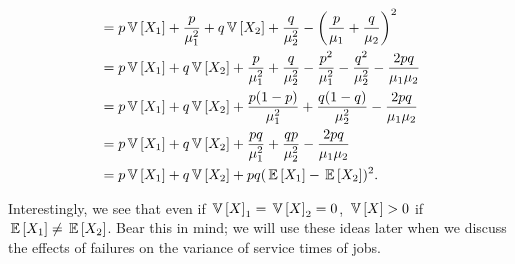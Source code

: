 \begin{question}
\begin{solution}
\begin{equation*}
\begin{split}
&= p \,\mathbb{V}\left[X_1\right] + \frac{p}{\mu_1^2} + q \,\mathbb{V}\left[X_2\right] + \frac{q}{\mu_2^2} - \left(\frac{p}{\mu_1}+\frac{q}{\mu_2}\right)^2 \\ 
&= p \,\mathbb{V}\left[X_1\right] + q \,\mathbb{V}\left[X_2\right]
+ \frac{p}{\mu_1^2} + \frac{q}{\mu_2^2}
- \frac{p^2}{\mu_1^2}-\frac{q^2}{\mu_2^2}  -\frac{2pq}{\mu_1\mu_2}\\ 
&= p \,\mathbb{V}\left[X_1\right] + q \,\mathbb{V}\left[X_2\right]
+ \frac{p(1-p)}{\mu_1^2} + \frac{q(1-q)}{\mu_2^2}
-\frac{2pq}{\mu_1\mu_2}\\ 
&= p \,\mathbb{V}\left[X_1\right] + q \,\mathbb{V}\left[X_2\right]
+ \frac{pq}{\mu_1^2} + \frac{qp}{\mu_2^2}
-\frac{2pq}{\mu_1\mu_2}\\ 
&= p \,\mathbb{V}\left[X_1\right] + q \,\mathbb{V}\left[X_2\right]
+ pq(\,\mathbb{E}\left[X_1\right] - \,\mathbb{E}\left[X_2\right])^2.
\end{split}
\end{equation*}

Interestingly, we see that even if $\,\mathbb{V}\left[X\right]_1 = \,\mathbb{V}\left[X\right]_2 = 0$, $\,\mathbb{V}\left[X\right] > 0$
if $\,\mathbb{E}\left[X_1\right] \neq \,\mathbb{E}\left[X_2\right]$. Bear this in mind; we will use these ideas
later when we discuss the effects of failures on the variance of
service times of jobs.

\end{solution}
\end{question}

